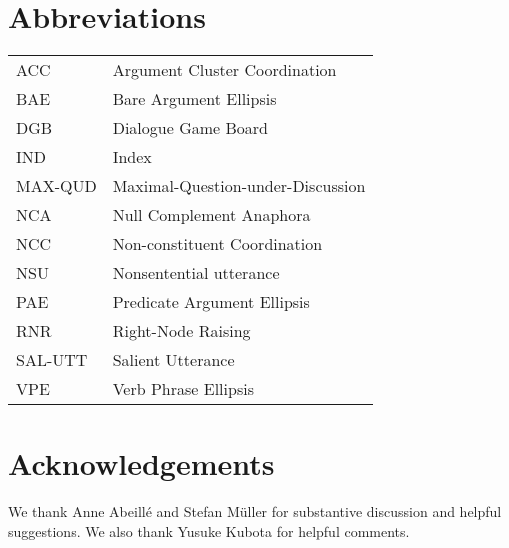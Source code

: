 \section*{Abbreviations}

\begin{tabularx}{.99\textwidth}{@{}lX}
ACC & Argument Cluster Coordination\\
BAE & Bare Argument Ellipsis\\
DGB & Dialogue Game Board\\
IND & Index\\
MAX-QUD & Maximal-Question-under-Discussion\\
NCA & Null Complement Anaphora\\
NCC & Non-constituent Coordination\\ 
NSU & Nonsentential utterance\\
PAE & Predicate Argument Ellipsis\\
RNR & Right-Node Raising\\
SAL-UTT & Salient Utterance\\
VPE & Verb Phrase Ellipsis\\
\end{tabularx}


\section*{Acknowledgements}
We thank Anne Abeill\'{e} and Stefan M\"{u}ller
for substantive discussion and helpful suggestions. We also thank  
Yusuke Kubota for helpful comments.  

{\sloppy
\printbibliography[heading=subbibliography,notkeyword=this]
}
%




